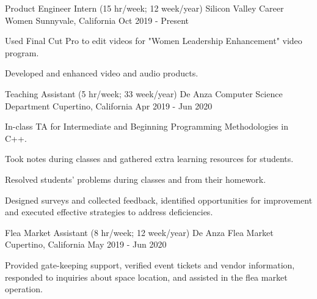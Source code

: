 

\begin{cventries}

  \cventry
    {Product Engineer Intern  (15 hr/week; 12 week/year) } %
    {Silicon Valley Career Women} %
    {Sunnyvale, California} %
    {Oct 2019 - Present} %
    {
	\begin{cvitems} %
      	\item Used Final Cut Pro to edit videos for "Women Leadership Enhancement" video program.
      	\item Developed and enhanced video and audio products.
	\end{cvitems}
    }
    
  \cventry
    {Teaching Assistant  (5 hr/week; 33 week/year) } %
    {De Anza Computer Science Department} %
    {Cupertino, California} %
    {Apr 2019 - Jun 2020} %
    {
	\begin{cvitems} %
      	\item In-class TA for Intermediate and Beginning Programming Methodologies in C++.
		\item Took notes during classes and gathered extra learning resources for students.       
      	\item Resolved students' problems during classes and from their homework.
      	\item Designed surveys and collected feedback, identified opportunities for improvement and executed effective strategies to address deficiencies.
	\end{cvitems}
    }
    
  \cventry
    {Flea Market Assistant  (8 hr/week; 12 week/year) } %
    {De Anza Flea Market} %
    {Cupertino, California} %
    {May 2019 - Jun 2020} %
    {
	\begin{cvitems} %
      	\item Provided gate-keeping support, verified event tickets and vendor information, responded to inquiries about space location, and assisted in the flea market operation.
	\end{cvitems}
    }
	  

\end{cventries}
